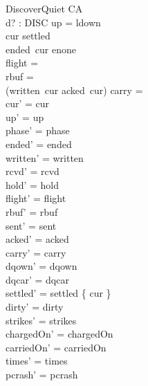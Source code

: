 \documentclass[a4paper,10pt,fleqn]{article}
\begin{document}
\begin{schema}{DiscoverQuiet}
  \Delta CA \\
  d? : DISC
\where
  up = ldown \\
  cur \notin settled \\
  ended~cur \neq enone \\
  flight = \emptyset \\
  rbuf = \emptyset \\
  (written~cur \setminus acked~cur) \cup carry = \emptyset \\
  cur' = cur \\
  up' = up \\
  phase' = phase \\
  ended' = ended \\
  written' = written \\
  rcvd' = rcvd \\
  hold' = hold \\
  flight' = flight \\
  rbuf' = rbuf \\
  sent' = sent \\
  acked' = acked \\
  carry' = carry \\
  dqown' = dqown \\
  dqcar' = dqcar \\
  settled' = settled \cup \{ cur \} \\
  dirty' = dirty \\
  strikes' = strikes \\
  chargedOn' = chargedOn \\
  carriedOn' = carriedOn \\
  times' = times \\
  pcrash' = pcrash
\end{schema}
\end{document}

